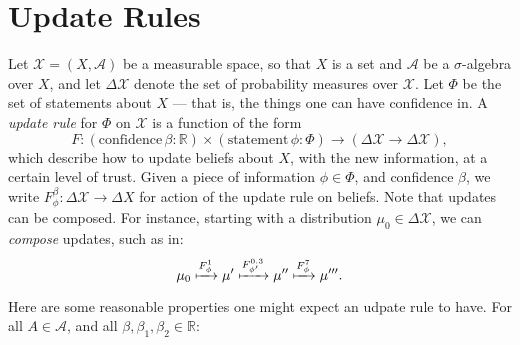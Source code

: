 \documentclass{article}
\begin{document}
\section{Update Rules}
\def\X{\mathcal X}
Let $\X = (X, \mathcal A)$ be a measurable space, so that $X$ is a set and $\mathcal A$ be a $\sigma$-algebra over $X$, and let $\Delta \X$ denote the set of probability measures over $\X$.
Let $\Phi$ be the set of statements about $X$ --- that is, the things one can have confidence in. 
A \emph{update rule} for $\Phi$ on $\X$ is a function of the form
\[
    F: (\text{confidence}\,\beta : \mathbb R) \times (\text{statement}\,\phi : \Phi) \to (\Delta\X  \to \Delta \X),
\]
which describe how to update beliefs about $X$, with the new information, at a certain level of trust.
Given a piece of information $\phi \in \Phi$, and confidence $\beta$, we write $F^\beta_\phi : \Delta\X \to \Delta X$ for action of the update rule on beliefs. 
Note that updates can be composed. For instance, starting with a distribution $\mu_0 \in \Delta \X$, we can \emph{compose} updates, such as in:
\[
    \mu_0 
        \xmapsto{F^1_{\phi}} \mu' 
        \xmapsto{F^{0.3}_{\phi'}} \mu''
        \xmapsto{F^{7}_{\phi}} \mu'''.
\]

Here are some reasonable properties one might expect an udpate rule to have. 
For all $A \in \mathcal A$, and all $\beta,\beta_1, \beta_2 \in \mathbb R$:
\end{document}
